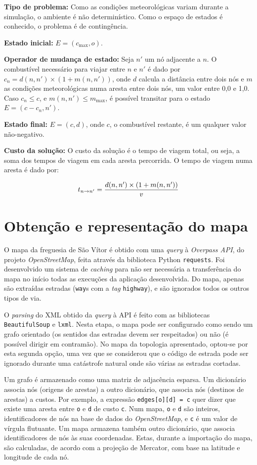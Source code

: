 \documentclass[12pt, a4paper]{article}
\begin{document}
\textbf{Tipo de problema:} Como as condições meteorológicas variam durante a simulação, o ambiente é
não determinístico. Como o espaço de estados é conhecido, o problema é de contingência.

\textbf{Estado inicial:} $E = (c_\text{max}, o)$.

\textbf{Operador de mudança de estado:} Seja $n'$ um nó adjacente a $n$. O combustível necessário
para viajar entre $n$ e $n'$ é dado por $c_n = d(n, n') \times (1 + m(n, n'))$, onde $d$ calcula a
distância entre dois nós e $m$ as condições meteorológicas numa aresta entre dois nós, um valor
entre 0,0 e 1,0. Caso $c_n \le c$, e $m(n, n') \le m_\text{max}$, é possível transitar para o estado
$E = (c - c_n, n')$.

\textbf{Estado final:} $E = (c, d)$, onde $c$, o combustível restante, é um qualquer valor
não-negativo.

\textbf{Custo da solução:} O custo da solução é o tempo de viagem total, ou seja, a soma dos tempos
de viagem em cada aresta percorrida. O tempo de viagem numa aresta é dado por:

$$t_{n \rightarrow n'} = {d(n, n') \times (1 + m(n, n')) \over v}$$

\section{Obtenção e representação do mapa}

O mapa da freguesia de São Vítor é obtido com uma \emph{query} à \emph{Overpass API}, do projeto
\emph{OpenStreetMap}, feita através da biblioteca Python \texttt{requests}. Foi desenvolvido um
sistema de \emph{caching} para não ser necessária a transferência do mapa no início todas as
execuções da aplicação desenvolvida. Do mapa, apenas são extraídas estradas (\texttt{way}s com a
\emph{tag} \texttt{highway}), e são ignorados todos os outros tipos de via.

O \emph{parsing} do XML obtido da \emph{query} à API é feito com as bibliotecas
\texttt{BeautifulSoup} e \texttt{lxml}. Nesta etapa, o mapa pode ser configurado como sendo um grafo
orientado (os sentidos das estradas devem ser respeitados) ou não (é possível dirigir em contramão).
No mapa da topologia apresentado, optou-se por esta segunda opção, uma vez que se considerou que o
código de estrada pode ser ignorado durante uma catástrofe natural onde são várias as estradas
cortadas.

Um grafo é armazenado como uma matriz de adjacência esparsa. Um dicionário associa nós (origens de
arestas) a outro dicionário, que associa nós (destinos de arestas) a custos. Por exemplo, a
expressão \texttt{edges[o][d] = c} quer dizer que existe uma aresta entre \texttt{o} e \texttt{d}
de custo \texttt{c}. Num mapa, \texttt{o} e \texttt{d} são inteiros, identificadores de nós na
base de dados do \emph{OpenStreetMap}, e \texttt{c} é um valor de vírgula flutuante. Um mapa
armazena também outro dicionário, que associa identificadores de nós às suas coordenadas. Estas,
durante a importação do mapa, são calculadas, de acordo com a projeção de Mercator, com base na
latitude e longitude de cada nó.
\end{document}
